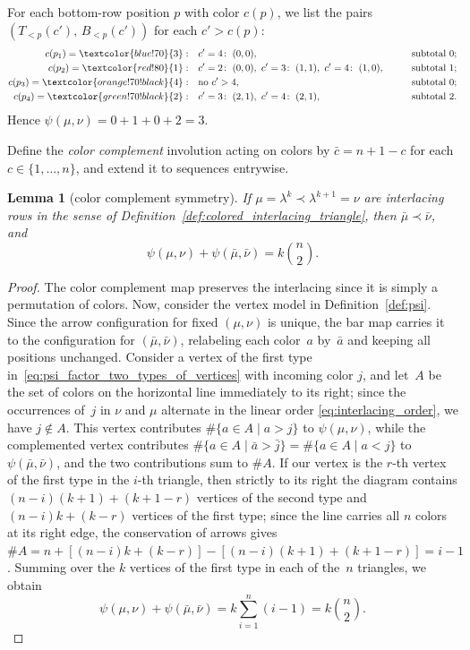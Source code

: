 \documentclass[pdftex]{sigma}
\numberwithin{equation}{section}
\newtheorem{Lemma}[Theorem]{Lemma}
\theoremstyle{definition}
\begin{document}
For each bottom-row position $p$ with color $c(p)$, we list the pairs
$(T_{<p}(c'),\, B_{<p}(c'))$ for each $c'>c(p)$:
\begin{alignat*}
	{2} c(p_1)=\textcolor{blue!70}{3}:     &\quad c'=4\colon\;(0,0),                                              &\qquad & \text{subtotal } 0;\\
	c(p_2)=\textcolor{red!80}{1}:          &\quad c'=2\colon\;(0,0),\  c'=3\colon\;(1,1),\
	c'=4\colon\;(1,0), &       & \text{subtotal } 1;\\
	c(p_3)=\textcolor{orange!70!black}{4}: &\quad \text{no }c'>4,                                                 &       & \text{subtotal } 0;\\
	c(p_4)=\textcolor{green!70!black}{2}:  &\quad c'=3\colon\;(2,1),\
	c'=4\colon\;(2,1),                      &       & \text{subtotal } 2.
\end{alignat*}
Hence $\psi(\mu,\nu) = 0+1+0+2 = 3$.

Define the \emph{color complement} involution acting on colors by
$\bar{c} = n+1-c$ for each $c \in \{1,\dots,n\}$, and extend it to sequences
entrywise.

\begin{Lemma}[color complement symmetry]
	\label{lem:color_complement} If $\mu = \lambda^k \prec \lambda^{k+1} = \nu$
	are interlacing rows in the sense of
	Definition~{\rm \ref{def:colored_interlacing_triangle}}, then $\bar{\mu} \prec \bar{\nu}$,
	and
	\[ \psi(\mu, \nu) + \psi(\bar{\mu}, \bar{\nu}) =
		k\binom{n}{2}.
	\]
\end{Lemma}
\begin{proof}
	The color complement map preserves the interlacing since it is simply a
	permutation of colors.
	Now, consider the vertex model in Definition~\ref{def:psi}.
	Since the arrow configuration for fixed $(\mu,\nu)$ is unique, the bar map
	carries it to the configuration for $(\bar{\mu},\bar{\nu})$, relabeling
	each color~$a$ by~$\bar{a}$ and keeping all positions unchanged.
	Consider a vertex of the first type in~\eqref{eq:psi_factor_two_types_of_vertices} with incoming color $j$, and
	let~$A$ be the set of colors on the horizontal line immediately to its
	right; since the occurrences of~$j$ in $\nu$ and $\mu$ alternate in the
	linear order \eqref{eq:interlacing_order}, we have $j\notin A$.
	This vertex contributes $\# \{ a\in A\mid a>j \}$ to
	$\psi(\mu,\nu)$, while the complemented vertex contributes
	$\# \{ a\in A \mid \bar{a}>\bar{j}  \}
	=\# \{ a\in A\mid a<j  \}$ to $\psi(\bar{\mu},\bar{\nu})$, and the
	two contributions sum to $\#A$.
	If our vertex is the $r$-th vertex of the first type in the $i$-th
	triangle, then strictly to its right the diagram contains
	$(n-i)(k+1)+(k+1-r)$ vertices of the second type and $(n-i)k+(k-r)$
	vertices of the first type; since the line carries all $n$ colors at its
	right edge, the conservation of arrows gives
	$\#A=n+[(n-i)k+(k-r)]-[(n-i)(k+1)+(k+1-r)]=i-1$.
	Summing over the $k$ vertices of the first type in each of the~$n$
	triangles, we obtain
\[
\psi(\mu, \nu) + \psi(\bar{\mu}, \bar{\nu})
	=k\sum_{i=1}^{n}(i-1)= k\binom{n}{2}.\tag*{\qed}
\]\renewcommand{\qed}{}
\end{proof}
\end{document}
